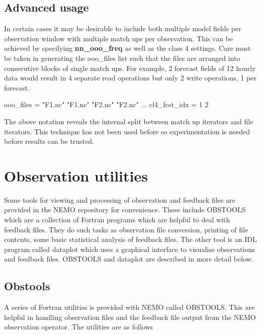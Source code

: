 \documentclass[../tex_main/NEMO_manual]{subfiles}
\begin{document}
\subsection{Advanced usage}

In certain cases it may be desirable to include both multiple model fields per
observation window with multiple match ups per observation. This can be achieved
by specifying \textbf{nn\_ooo\_freq} as well as the class 4 settings. Care must
be taken in generating the ooo\_files list such that the files are arranged into
consecutive blocks of single match ups. For example, 2 forecast fields 
of 12 hourly data would result in 4 separate read operations but only 2 write
operations, 1 per forecast.

\begin{forlines}
   ooo_files = "F1.nc" "F1.nc" "F2.nc" "F2.nc"
...
   cl4_fcst_idx = 1 2
\end{forlines}

The above notation reveals the internal split between match up iterators and file
iterators. This technique has not been used before so experimentation is needed
before results can be trusted.




\newpage

\section{Observation utilities}
\label{sec:OBS_obsutils}

Some tools for viewing and processing of observation and feedback files are provided in the
NEMO repository for convenience. These include OBSTOOLS which are a collection of Fortran
programs which are helpful to deal with feedback files. They do such tasks as observation file
conversion, printing of file contents, some basic statistical analysis of feedback files. The
other tool is an IDL program called dataplot which uses a graphical interface to visualise
observations and feedback files. OBSTOOLS and dataplot are described in more detail below.  

\subsection{Obstools}

A series of Fortran utilities is provided with NEMO called OBSTOOLS. This are helpful in
handling observation files and the feedback file output from the NEMO observation operator.
The utilities are as follows
\end{document}
